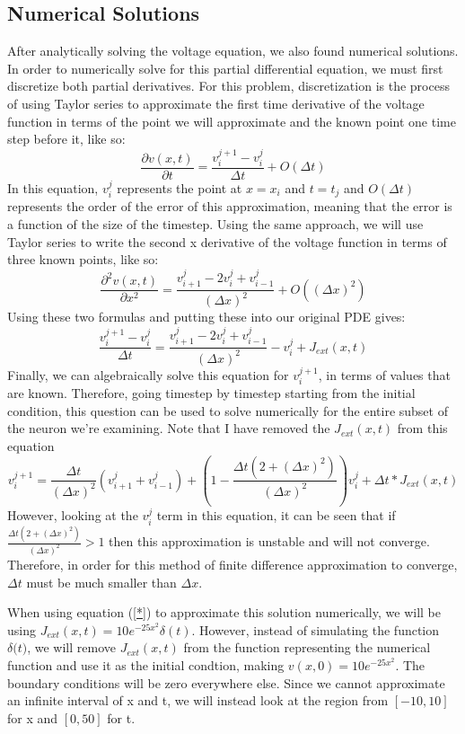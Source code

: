 \documentclass[12pt]{article}
\begin{document}
\subsection{Numerical Solutions}
After analytically solving the voltage equation, we also found numerical solutions. In order to numerically solve for this partial differential equation, we must first discretize both partial derivatives. For this problem, discretization is the process of using Taylor series to approximate the first time derivative of the voltage function in terms of the point we will approximate and the known point one time step before it, like so:
\[\frac{\partial{v(x,t)}}{\partial{t}}=\frac{v^{j+1}_i-v^j_i}{\Delta{t}}+O(\Delta{t})\]
In this equation, $v^j_i$ represents the point at $x=x_i$ and $t=t_j$ and $O(\Delta{t})$ represents the order of the error of this approximation, meaning that the error is a function of the size of the timestep.
Using the same approach, we will use Taylor series to write the second x derivative of the voltage function in terms of three known points, like so:
\[\frac{\partial^2{v(x,t)}}{\partial{x}^2}=\frac{v^{j}_{i+1}-2v^j_i+v^j_{i-1}}{(\Delta{x})^2}+O((\Delta{x})^2)\]
Using these two formulas and putting these into our original PDE gives:
\[\frac{v^{j+1}_i-v^j_i}{\Delta{t}}=\frac{v^{j}_{i+1}-2v^j_i+v^j_{i-1}}{(\Delta{x})^2}-v^j_i+J_{ext}(x,t)\]
Finally, we can algebraically solve this equation for $v^{j+1}_i$, in terms of values that are known. Therefore, going timestep by timestep starting from the initial condition, this question can be used to solve numerically for the entire subset of the neuron we're examining. Note that I have removed the $J_{ext}(x,t)$ from this equation
\begin{equation} \label{*}
v^{j+1}_i=\frac{\Delta{t}}{(\Delta{x})^2}(v^{j}_{i+1}+v^{j}_{i-1})+(1-\frac{\Delta{t}(2+(\Delta{x})^2)}{(\Delta{x})^2})v^{j}_{i}+\Delta{t}*J_{ext}(x,t)
\end {equation}
However, looking at the $v^{j}_{i}$ term in this equation, it can be seen that if $\frac{\Delta{t}(2+(\Delta{x})^2)}{(\Delta{x})^2}>1$ then this approximation is unstable and will not converge. Therefore, in order for this method of finite difference approximation to converge, $\Delta{t}$ must be much smaller than $\Delta{x}$. \par 
When using equation (\ref{*}) to approximate this solution numerically, we will be using $J_{ext}(x,t)=10e^{-25x^2}\delta{(t)}$. However, instead of simulating the function $\delta{(t})$, we will remove $J_{ext}(x,t)$ from the function representing the numerical function and use it as the initial condtion, making $v(x,0)=10e^{-25x^2}$. The boundary conditions will be zero everywhere else. Since we cannot approximate an infinite interval of x and t, we will instead look at the region from $[-10,10]$ for x and $[0,50]$ for t. 
\end{document}
